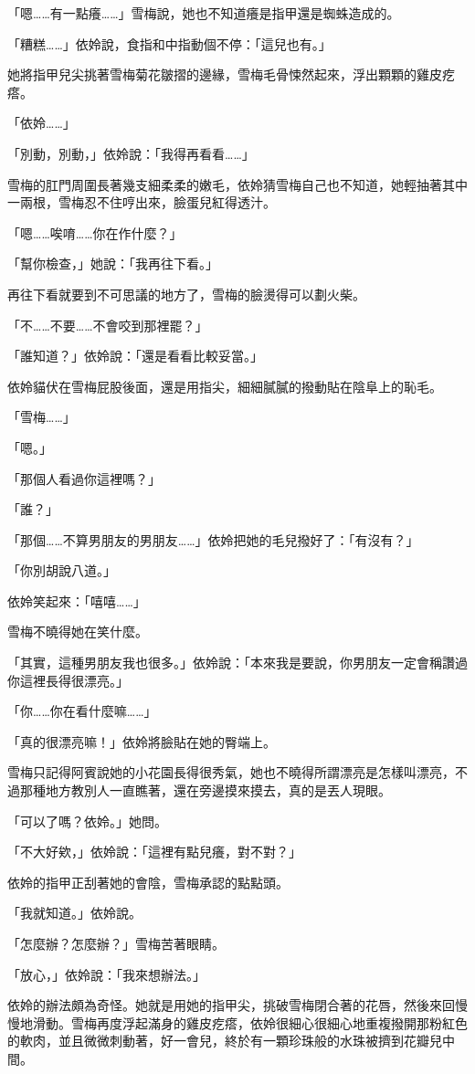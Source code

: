 「嗯……有一點癢……」雪梅說，她也不知道癢是指甲還是蜘蛛造成的。

「糟糕……」依姈說，食指和中指動個不停：「這兒也有。」

她將指甲兒尖挑著雪梅菊花皺摺的邊緣，雪梅毛骨悚然起來，浮出顆顆的雞皮疙瘩。

「依姈……」

「別動，別動，」依姈說：「我得再看看……」

雪梅的肛門周圍長著幾支細柔柔的嫩毛，依姈猜雪梅自己也不知道，她輕抽著其中一兩根，雪梅忍不住哼出來，臉蛋兒紅得透汁。

「嗯……唉唷……你在作什麼？」

「幫你檢查，」她說：「我再往下看。」

再往下看就要到不可思議的地方了，雪梅的臉燙得可以劃火柴。

「不……不要……不會咬到那裡罷？」

「誰知道？」依姈說：「還是看看比較妥當。」

依姈貓伏在雪梅屁股後面，還是用指尖，細細膩膩的撥動貼在陰阜上的恥毛。

「雪梅……」

「嗯。」

「那個人看過你這裡嗎？」

「誰？」

「那個……不算男朋友的男朋友……」依姈把她的毛兒撥好了：「有沒有？」

「你別胡說八道。」

依姈笑起來：「嘻嘻……」

雪梅不曉得她在笑什麼。

「其實，這種男朋友我也很多。」依姈說：「本來我是要說，你男朋友一定會稱讚過你這裡長得很漂亮。」

「你……你在看什麼嘛……」

「真的很漂亮嘛！」依姈將臉貼在她的臀端上。

雪梅只記得阿賓說她的小花園長得很秀氣，她也不曉得所謂漂亮是怎樣叫漂亮，不過那種地方教別人一直瞧著，還在旁邊摸來摸去，真的是丟人現眼。

「可以了嗎？依姈。」她問。

「不大好欸，」依姈說：「這裡有點兒癢，對不對？」

依姈的指甲正刮著她的會陰，雪梅承認的點點頭。

「我就知道。」依姈說。

「怎麼辦？怎麼辦？」雪梅苦著眼睛。

「放心，」依姈說：「我來想辦法。」

依姈的辦法頗為奇怪。她就是用她的指甲尖，挑破雪梅閉合著的花唇，然後來回慢慢地滑動。雪梅再度浮起滿身的雞皮疙瘩，依姈很細心很細心地重複撥開那粉紅色的軟肉，並且微微刺動著，好一會兒，終於有一顆珍珠般的水珠被擠到花瓣兒中間。

